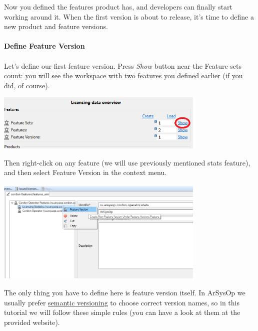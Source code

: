 \documentclass[12pt]{report}
\begin{document}
Now you defined the features product has, and developers can finally start working around it. When the first version is about to release, it's time to define
a new product and feature versions.

\paragraph*{Define Feature Version}
\paragraph*{}

Let's define our first feature version. Press \textit{Show} button near the Feature sets count: you will see the workspace with two features
you defined earlier (if you did, of course).

\begin{center}
    \includegraphics[width=0.75\textwidth]{feature_set_show}
\end{center}

Then right-click on any feature (we will use previously mentioned stats feature), and then select Feature Version in the context menu.

\begin{center}
    \includegraphics[width=0.75\textwidth]{feature_version_create}
\end{center}

The only thing you have to define here is feature version itself. In ArSysOp we usually prefer \href{https://semver.org/}{semantic versioning} to choose correct version names,
so in this tutorial we will follow these simple rules (you can have a look at them at the provided website).
\end{document}
